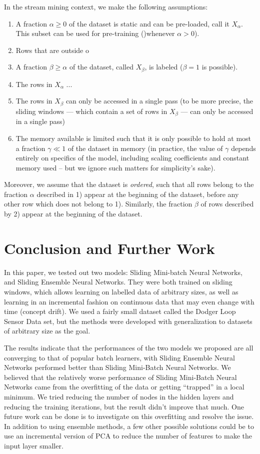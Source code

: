 \documentclass[conference]{IEEEtran}
\begin{document}
In the stream mining context, we make the following assumptions:
\begin{enumerate}
	\item A fraction $\alpha \geq 0$ of the dataset is static and can be pre-loaded, call it $X_\alpha$. This subset can be used for pre-training ()whenever $\alpha > 0$).
	\item Rows that are outside o
	\item A fraction $\beta \geq \alpha$ of the dataset, called $X_\beta$, is labeled ($\beta = 1$ is possible).
	\item The rows in $X_\alpha$ ...
	\item The rows in $X_\beta$ can only be accessed in a single pass (to be more precise, the sliding windows --- which contain a set of rows in $X_\beta$ --- can only be accessed in a single pass)
	\item The memory available is limited such that it is only possible to hold at most a fraction $\gamma \ll 1$ of the dataset in memory (in practice, the value of $\gamma$ depends entirely on
	specifics of the model, including scaling coefficients and constant memory used -- but we ignore such matters for simplicity's sake).
\end{enumerate}
Moreover, we assume that the dataset is \emph{ordered}, such that all rows belong to the fraction $\alpha$ described in 1) appear at the beginning of the dataset, before any other row which does not belong to 1). Similarly, the fraction $\beta$ of rows described by 2) appear at the beginning of the dataset.


\section{Conclusion and Further Work}
\label{sec:conclusion}

In this paper, we tested out two models: Sliding Mini-batch Neural Networks,  and Sliding Ensemble Neural Networks. They were both trained on sliding windows, which allows learning on labelled data of arbitrary sizes, as well as learning in an incremental fashion on continuous data that may even change with time (concept drift). We used a fairly small dataset called the Dodger Loop Sensor Data set, but the methods were developed with generalization to datasets of arbitrary size as the goal.

The results indicate that the performances of the two models we proposed are all converging to that of popular batch learners, with Sliding Ensemble Neural Networks performed better than Sliding Mini-Batch Neural Networks. We believed that the relatively worse performance of  Sliding Mini-Batch Neural Networks came from the overfitting of the data or getting ``trapped'' in a local minimum. We tried reducing the number of nodes in the hidden layers and reducing the training iterations, but the result didn't improve that much. One future work can be done is to investigate on this overfitting and resolve the issue. In addition to using ensemble methods, a few other possible solutions could be to use an incremental version of PCA to reduce the number of features to make the input layer smaller.
\end{document}
